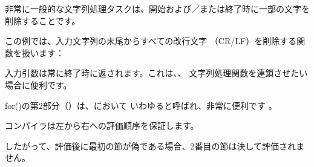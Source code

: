 \newcommand{\CRLF}{\ac{CR}/\ac{LF}}

非常に一般的な文字列処理タスクは、開始および／または終了時に一部の文字を削除することです。

この例では、入力文字列の末尾からすべての改行文字
（\CRLF{}）を削除する関数を扱います：



入力引数は常に終了時に返されます。これは、、
文字列処理関数を連鎖させたい場合に便利です。

for()の第2部分（）は、\CCpp において
いわゆると呼ばれ、非常に便利です 。

\CCpp コンパイラは左から右への評価順序を保証します。

したがって、評価後に最初の節が偽である場合、2番目の節は決して評価されません。





